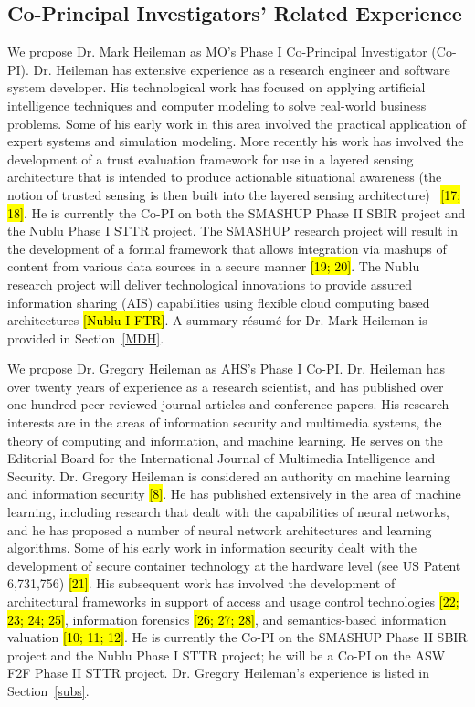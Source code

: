 \documentclass{sbir}
\begin{document}
\subsection{Co-Principal Investigators' Related Experience}
We propose Dr. Mark Heileman as MO's Phase I Co-Principal Investigator (Co-PI). Dr. Heileman has extensive experience as a research engineer and software system developer. His technological work has focused on applying artificial intelligence techniques and computer modeling to solve real-world business problems. Some of his early work in this area involved the practical application of expert systems and simulation modeling. More recently his work has involved the development of a trust evaluation framework for use in a layered sensing architecture that is intended to produce actionable situational awareness (the notion of trusted sensing is then built into the layered sensing architecture)~\cite{HeHeShGiJa:11} \hl{[17; 18]}. He is currently the Co-PI on both the SMASHUP Phase II SBIR project and the Nublu Phase I STTR project. The SMASHUP research project will result in the development of a formal framework that allows integration via mashups of content from various data sources in a secure manner \hl{[19; 20]}. The Nublu research project will deliver technological innovations to provide assured information sharing (AIS) capabilities using flexible cloud computing based architectures \hl{[Nublu I FTR]}. A summary r\'esum\'e for Dr. Mark Heileman is provided in Section~\ref{MDH}.

We propose Dr. Gregory Heileman as AHS's Phase I Co-PI. Dr. Heileman has over twenty years of experience as a research scientist, and has published over one-hundred peer-reviewed journal articles and conference papers. His research interests are in the areas of information security and multimedia systems, the theory of computing and information, and machine learning. He serves on the Editorial Board for the International Journal of Multimedia Intelligence and Security. Dr. Gregory Heileman is considered an authority on machine learning and information security \hl{[8]}. He has published extensively in the area of machine learning, including research that dealt with the capabilities of neural networks, and he has proposed a number of neural network architectures and learning algorithms. Some of his early work in information security dealt with the development of secure container technology at the hardware level (see US Patent 6,731,756) \hl{[21]}. His subsequent work has involved the development of architectural frameworks in support of access and usage control technologies \hl{[22; 23; 24; 25]}, information forensics \hl{[26; 27; 28]}, and semantics-based information valuation \hl{[10; 11; 12]}. He is currently the Co-PI on the SMASHUP Phase II SBIR project and the Nublu Phase I STTR project; he will be a Co-PI on the ASW F2F Phase II STTR project. Dr. Gregory Heileman's experience is listed in Section~\ref{subs}.
\end{document}
